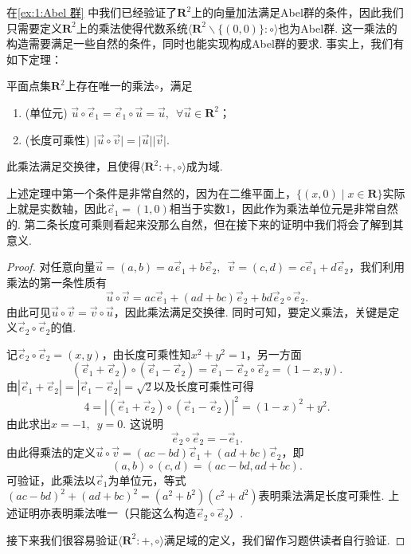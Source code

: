 在\autoref{ex:1:Abel 群} 中我们已经验证了$\mathbf{R}^2$上的向量加法满足Abel群的条件，因此我们只需要定义$\mathbf{R}^2$上的乘法使得代数系统$\langle\mathbf{R}^2\backslash\{(0,0)\}:\circ\rangle$也为Abel群. 这一乘法的构造需要满足一些自然的条件，同时也能实现构成Abel群的要求. 事实上，我们有如下定理：
\begin{theorem}\label{thm:1:复数乘法构造}
    平面点集$\mathbf{R}^2$上存在唯一的乘法$\circ$，满足
    \begin{enumerate}
        \item (单位元) $\vec{u}\circ\vec{e}_1=\vec{e}_1\circ\vec{u}=\vec{u},\enspace\forall\vec{u}\in\mathbf{R}^2$；

        \item (长度可乘性) $\lvert\vec{u}\circ\vec{v}\rvert=\lvert\vec{u}\rvert\lvert\vec{v}\rvert$.
    \end{enumerate}
    此乘法满足交换律，且使得$\langle\mathbf{R}^2:+,\circ\rangle$成为域.
\end{theorem}

上述定理中第一个条件是非常自然的，因为在二维平面上，$\{(x,0) \mid x\in\mathbf{R}\}$实际上就是实数轴，因此$\vec{e}_1=(1,0)$相当于实数1，因此作为乘法单位元是非常自然的. 第二条长度可乘则看起来没那么自然，但在接下来的证明中我们将会了解到其意义.

\begin{proof}
    对任意向量$\vec{u}=(a,b)=a\vec{e}_1+b\vec{e}_2,\enspace \vec{v}=(c,d)=c\vec{e}_1+d\vec{e}_2$，我们利用乘法的第一条性质有
    \[\vec{u}\circ\vec{v}=ac\vec{e}_1+(ad+bc)\vec{e}_2+bd\vec{e}_2\circ\vec{e}_2.\]
    由此可见$\vec{u}\circ\vec{v}=\vec{v}\circ\vec{u}$，因此乘法满足交换律. 同时可知，要定义乘法，关键是定义$\vec{e}_2\circ\vec{e}_2$的值.

    记$\vec{e}_2\circ\vec{e}_2=(x,y)$，由长度可乘性知$x^2+y^2=1$，另一方面
    \[(\vec{e}_1+\vec{e}_2)\circ(\vec{e}_1-\vec{e}_2)=\vec{e}_1-\vec{e}_2\circ\vec{e}_2=(1-x,y).\]
    由$|\vec{e}_1+\vec{e}_2|=|\vec{e}_1-\vec{e}_2|=\sqrt{2}$以及长度可乘性可得
    \[4=|(\vec{e}_1+\vec{e}_2)\circ(\vec{e}_1-\vec{e}_2)|^2=(1-x)^2+y^2.\]
    由此求出$x=-1,\enspace y=0$. 这说明
    \[\vec{e}_2\circ\vec{e}_2=-\vec{e}_1.\]
    由此得乘法的定义$\vec{u}\circ\vec{v}=(ac-bd)\vec{e}_1+(ad+bc)\vec{e}_2$，即
    \[(a,b)\circ(c,d)=(ac-bd,ad+bc).\]
    可验证，此乘法以$\vec{e}_1$为单位元，等式$(ac-bd)^2+(ad+bc)^2=(a^2+b^2)(c^2+d^2)$表明乘法满足长度可乘性. 上述证明亦表明乘法唯一（只能这么构造$\vec{e}_2\circ\vec{e}_2$）.

    接下来我们很容易验证$\langle\mathbf{R}^2:+,\circ\rangle$满足域的定义，我们留作习题供读者自行验证.
\end{proof}

